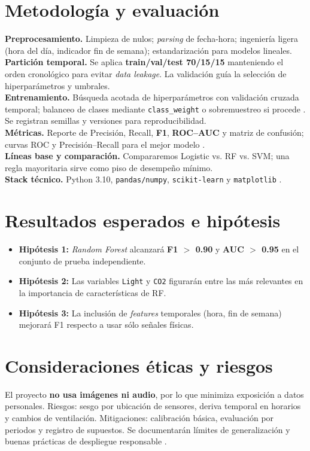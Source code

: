 \documentclass[11pt,letterpaper]{article}
\begin{document}
\section*{Metodología y evaluación}
\textbf{Preprocesamiento.} Limpieza de nulos; \textit{parsing} de fecha-hora; ingeniería ligera (hora del día, indicador fin de semana); estandarización para modelos lineales.\\[3pt]
\textbf{Partición temporal.} Se aplica \textbf{train/val/test 70/15/15} manteniendo el orden cronológico para evitar \textit{data leakage}. La validación guía la selección de hiperparámetros y umbrales.\\[3pt]
\textbf{Entrenamiento.} Búsqueda acotada de hiperparámetros con validación cruzada temporal; balanceo de clases mediante \texttt{class\_weight} o sobremuestreo si procede \cite{hegarcia2009}. Se registran semillas y versiones para reproducibilidad.\\[3pt]
\textbf{Métricas.} Reporte de Precisión, Recall, \textbf{F1}, \textbf{ROC--AUC} y matriz de confusión; curvas ROC y Precisión--Recall para el mejor modelo \cite{saito2015}.\\[3pt]
\textbf{Líneas base y comparación.} Compararemos Logistic vs. RF vs. SVM; una regla mayoritaria sirve como piso de desempeño mínimo.\\[3pt]
\textbf{Stack técnico.} Python 3.10, \texttt{pandas/numpy}, \texttt{scikit-learn} y \texttt{matplotlib} \cite{pedregosa2011}.

\section*{Resultados esperados e hipótesis}
\begin{itemize}[leftmargin=1.2em,itemsep=0.2em]
    \item \textbf{Hipótesis 1:} \emph{Random Forest} alcanzará \textbf{F1 $>$ 0.90} y \textbf{AUC $>$ 0.95} en el conjunto de prueba independiente.
    \item \textbf{Hipótesis 2:} Las variables \texttt{Light} y \texttt{CO2} figurarán entre las más relevantes en la importancia de características de RF.
    \item \textbf{Hipótesis 3:} La inclusión de \textit{features} temporales (hora, fin de semana) mejorará F1 respecto a usar sólo señales físicas.
\end{itemize}

\section*{Consideraciones éticas y riesgos}
El proyecto \textbf{no usa imágenes ni audio}, por lo que minimiza exposición a datos personales. Riesgos: sesgo por ubicación de sensores, deriva temporal en horarios y cambios de ventilación. Mitigaciones: calibración básica, evaluación por periodos y registro de supuestos. Se documentarán límites de generalización y buenas prácticas de despliegue responsable \cite{nist2021}.
\end{document}
